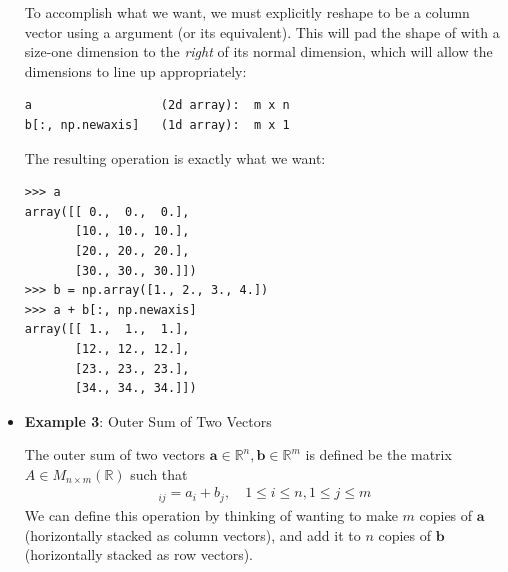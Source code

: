 \begin{itemize}
To accomplish what we want, we must explicitly reshape  to be a column vector using a  argument (or its equivalent).
This will pad the shape of  with a size-one dimension to the \emph{right} of its normal dimension, which will allow the dimensions to line up appropriately:
\begin{lstlisting}
a	               (2d array):  m x n
b[:, np.newaxis]   (1d array):  m x 1
\end{lstlisting}

The resulting operation is exactly what we want:

\begin{lstlisting}
>>> a
array([[ 0.,  0.,  0.],
       [10., 10., 10.],
       [20., 20., 20.],
       [30., 30., 30.]])
>>> b = np.array([1., 2., 3., 4.])
>>> a + b[:, np.newaxis]
array([[ 1.,  1.,  1.],
       [12., 12., 12.],
       [23., 23., 23.],
       [34., 34., 34.]])
\end{lstlisting}



\item  \textbf{Example 3}: Outer Sum of Two Vectors

The outer sum of two vectors $\mathbf{a} \in \mathbb{R}^n, \mathbf{b} \in \mathbb{R}^m$ is defined be the matrix $A \in M_{n \times m}(\mathbb{R})$ such that
\begin{align*}
	[A]_{ij} = a_i + b_j, \quad 1 \leq i \leq n, 1 \leq j \leq m
\end{align*}
We can define this operation by thinking of wanting to make $m$ copies of $\mathbf{a}$ (horizontally stacked as column vectors), and add it to $n$ copies of $\mathbf{b}$ (horizontally stacked as row vectors).


\end{itemize}
